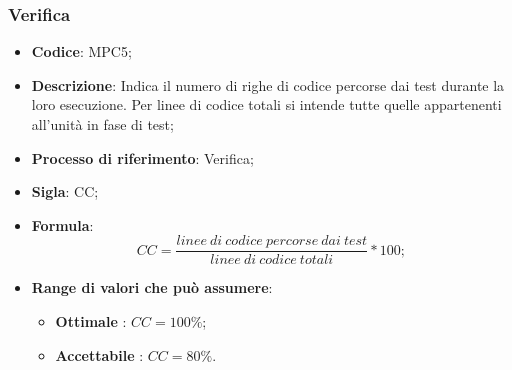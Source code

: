 \subsubsection{Verifica}
\vspace{-1cm}
\begin{itemize}
	\item \textbf{Codice}: MPC5;
	\item \textbf{Descrizione}: Indica il numero di righe di codice percorse dai test durante la loro
esecuzione. Per linee di codice totali si intende tutte quelle appartenenti all'unità in fase di test;
	\item \textbf{Processo di riferimento}: Verifica;
	\item \textbf{Sigla}: CC;
	\item \textbf{Formula}: \[ CC = \frac{linee \ di \ codice \ percorse \ dai \ test}{linee \ di \ codice \ totali} \ast 100;\]
	\item \textbf{Range di valori che può assumere}: 
		\begin{itemize}
			\item \textbf{Ottimale} : $CC = 100 \%$;
			\item \textbf{Accettabile} : $CC = 80 \%$.
		\end{itemize}
\end{itemize}

